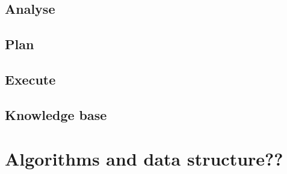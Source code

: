 \subsection{Analyse}
\subsection{Plan}
\subsection{Execute}
\subsection{Knowledge base}

\section{Algorithms and data structure??}

